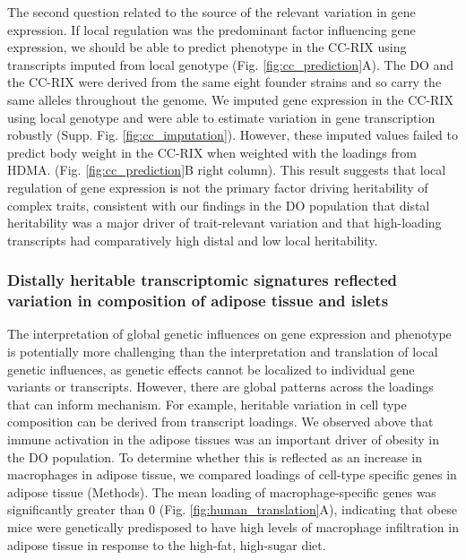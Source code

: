 \documentclass[
]{article}
\begin{document}
The second question related to the source of the relevant variation in
gene expression. If local regulation was the predominant factor
influencing gene expression, we should be able to predict phenotype in
the CC-RIX using transcripts imputed from local genotype (Fig.
\ref{fig:cc_prediction}A). The DO and the CC-RIX were derived from the
same eight founder strains and so carry the same alleles throughout the
genome. We imputed gene expression in the CC-RIX using local genotype
and were able to estimate variation in gene transcription robustly
(Supp. Fig. \ref{fig:cc_imputation}). However, these imputed values
failed to predict body weight in the CC-RIX when weighted with the
loadings from HDMA. (Fig. \ref{fig:cc_prediction}B right column). This
result suggests that local regulation of gene expression is not the
primary factor driving heritability of complex traits, consistent with
our findings in the DO population that distal heritability was a major
driver of trait-relevant variation and that high-loading transcripts had
comparatively high distal and low local heritability.

\subsubsection{Distally heritable transcriptomic signatures reflected
variation in composition of adipose tissue and
islets}\label{distally-heritable-transcriptomic-signatures-reflected-variation-in-composition-of-adipose-tissue-and-islets}

The interpretation of global genetic influences on gene expression and
phenotype is potentially more challenging than the interpretation and
translation of local genetic influences, as genetic effects cannot be
localized to individual gene variants or transcripts. However, there are
global patterns across the loadings that can inform mechanism. For
example, heritable variation in cell type composition can be derived
from transcript loadings. We observed above that immune activation in
the adipose tissues was an important driver of obesity in the DO
population. To determine whether this is reflected as an increase in
macrophages in adipose tissue, we compared loadings of cell-type
specific genes in adipose tissue (Methods). The mean loading of
macrophage-specific genes was significantly greater than 0 (Fig.
\ref{fig:human_translation}A), indicating that obese mice were
genetically predisposed to have high levels of macrophage infiltration
in adipose tissue in response to the high-fat, high-sugar diet.
\end{document}
